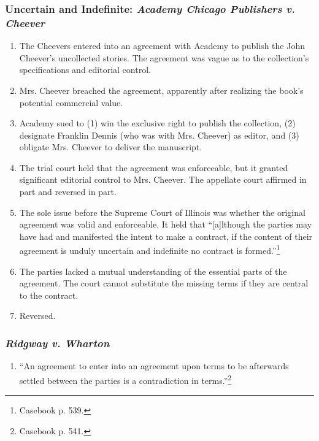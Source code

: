 \subsubsection{Uncertain and Indefinite: \emph{Academy Chicago Publishers v. 
Cheever}}

\begin{enumerate}
    \item The Cheevers entered into an agreement with Academy to publish the 
    John Cheever's uncollected stories. The agreement was vague as to the 
    collection's specifications and editorial control.
    \item Mrs. Cheever breached the agreement, apparently after realizing the 
    book's potential commercial value.
    \item Academy sued to (1) win the exclusive right to publish the 
    collection, (2) designate Franklin Dennis (who was with Mrs. Cheever) as 
    editor, and (3) obligate Mrs. Cheever to deliver the manuscript.
    \item The trial court held that the agreement was enforceable, but it 
    granted significant editorial control to Mrs. Cheever. The appellate court 
    affirmed in part and reversed in part.
    \item The sole issue before the Supreme Court of Illinois was whether the 
    original agreement was valid and enforceable. It held that ``[a]lthough 
    the parties may have had and manifested the intent to make a contract, if 
    the content of their agreement is unduly uncertain and indefinite no 
    contract is formed.''\footnote{Casebook p. 539.}
    \item The parties lacked a mutual understanding of the essential parts of 
    the agreement. The court cannot substitute the missing terms if they are 
    central to the contract.
    \item Reversed.
\end{enumerate}

\subsubsection{\emph{Ridgway v. Wharton}}

\begin{enumerate}
    \item ``An agreement to enter into an agreement upon terms to be 
    afterwards settled between the parties is a contradiction in 
    terms.''\footnote{Casebook p. 541.}
\end{enumerate}

